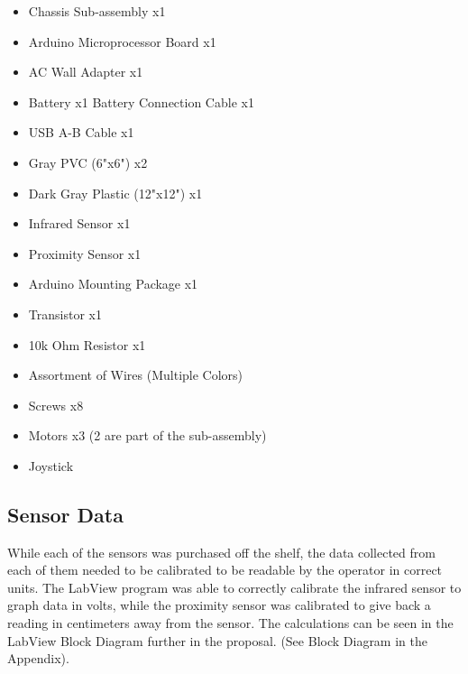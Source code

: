 \documentclass{article}
\begin{document}
\begin{itemize}
    \item Chassis Sub-assembly x1
    \item Arduino Microprocessor Board x1
    \item AC Wall Adapter x1
    \item Battery x1
    \text Battery Connection Cable x1
    \item USB A-B Cable x1
    \item Gray PVC (6"x6") x2
    \item Dark Gray Plastic (12"x12") x1
    \item Infrared Sensor x1
    \item Proximity Sensor x1
    \item Arduino Mounting Package x1
    \item Transistor x1
    \item 10k Ohm Resistor x1
    \item Assortment of Wires (Multiple Colors)
    \item Screws x8
    \item Motors x3 (2 are part of the sub-assembly)
    \item Joystick
\end{itemize}

\subsection{Sensor Data}
While each of the sensors was purchased off the shelf, the data collected from each of them needed to be calibrated to be readable by the operator in correct units. The LabView program was able to correctly calibrate the infrared sensor to graph data in volts, while the proximity sensor was calibrated to give back a reading in centimeters away from the sensor. The calculations can be seen in the LabView Block Diagram further in the proposal. (See Block Diagram in the Appendix).
\end{document}

